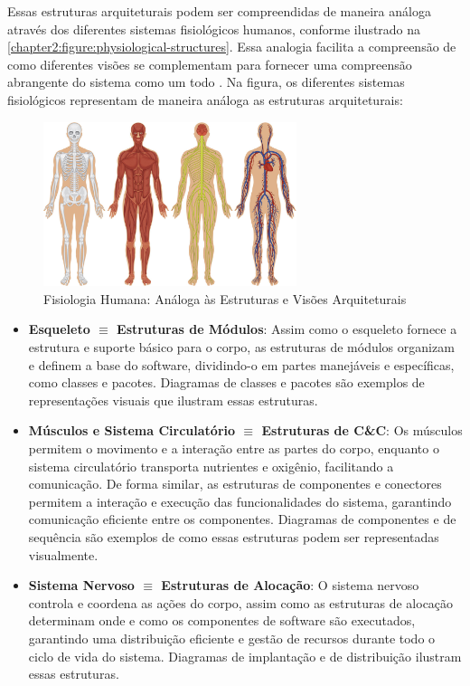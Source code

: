 Essas estruturas arquiteturais podem ser compreendidas de maneira análoga através dos diferentes sistemas fisiológicos humanos, conforme ilustrado na \autoref{chapter2:figure:physiological-structures}. Essa analogia facilita a compreensão de como diferentes visões se complementam para fornecer uma compreensão abrangente do sistema como um todo \cite{Bass2021}. Na figura, os diferentes sistemas fisiológicos representam de maneira análoga as estruturas arquiteturais:

\begin{figure}[htb]
\centering
\caption{Fisiologia Humana: Análoga às Estruturas e Visões Arquiteturais}
\label{chapter2:figure:physiological-structures}
\includegraphics[width=0.66\textwidth]{images/chapter2-arch-physiological-structures.jpeg}
\end{figure}

\begin{itemize}
    \item \textbf{Esqueleto $\equiv$ Estruturas de Módulos}: Assim como o esqueleto fornece a estrutura e suporte básico para o corpo, as estruturas de módulos organizam e definem a base do software, dividindo-o em partes manejáveis e específicas, como classes e pacotes. Diagramas de classes e pacotes são exemplos de representações visuais que ilustram essas estruturas.

    \item \textbf{Músculos e Sistema Circulatório $\equiv$ Estruturas de C\&C}: Os músculos permitem o movimento e a interação entre as partes do corpo, enquanto o sistema circulatório transporta nutrientes e oxigênio, facilitando a comunicação. De forma similar, as estruturas de componentes e conectores permitem a interação e execução das funcionalidades do sistema, garantindo comunicação eficiente entre os componentes. Diagramas de componentes e de sequência são exemplos de como essas estruturas podem ser representadas visualmente.

    \item \textbf{Sistema Nervoso $\equiv$ Estruturas de Alocação}: O sistema nervoso controla e coordena as ações do corpo, assim como as estruturas de alocação determinam onde e como os componentes de software são executados, garantindo uma distribuição eficiente e gestão de recursos durante todo o ciclo de vida do sistema. Diagramas de implantação e de distribuição ilustram essas estruturas.
\end{itemize}

